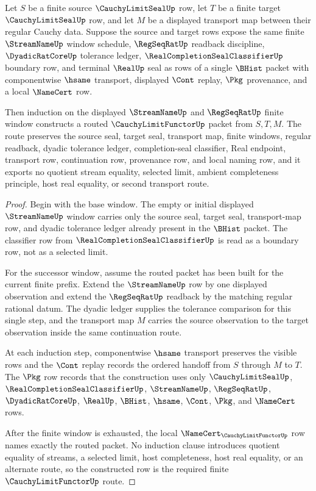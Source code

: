 \begin{theorem}
\label{thm:cauchy-limit-functor-induction-route}
Let $S$ be a finite source $\CauchyLimitSealUp$ row, let $T$ be a finite target $\CauchyLimitSealUp$ row, and let $M$ be a displayed transport map between their regular Cauchy data. Suppose the source and target rows expose the same finite $\StreamNameUp$ window schedule, $\RegSeqRatUp$ readback discipline, $\DyadicRatCoreUp$ tolerance ledger, $\RealCompletionSealClassifierUp$ boundary row, and terminal $\RealUp$ seal as rows of a single $\BHist$ packet with componentwise $\hsame$ transport, displayed $\Cont$ replay, $\Pkg$ provenance, and a local $\NameCert$ row.

Then induction on the displayed $\StreamNameUp$ and $\RegSeqRatUp$ finite window constructs a routed $\CauchyLimitFunctorUp$ packet from $S,T,M$. The route preserves the source seal, target seal, transport map, finite windows, regular readback, dyadic tolerance ledger, completion-seal classifier, Real endpoint, transport row, continuation row, provenance row, and local naming row, and it exports no quotient stream equality, selected limit, ambient completeness principle, host real equality, or second transport route.
\end{theorem}
\begin{proof}
Begin with the base window. The empty or initial displayed $\StreamNameUp$ window carries only the source seal, target seal, transport-map row, and dyadic tolerance ledger already present in the $\BHist$ packet. The classifier row from $\RealCompletionSealClassifierUp$ is read as a boundary row, not as a selected limit.

For the successor window, assume the routed packet has been built for the current finite prefix. Extend the $\StreamNameUp$ row by one displayed observation and extend the $\RegSeqRatUp$ readback by the matching regular rational datum. The dyadic ledger supplies the tolerance comparison for this single step, and the transport map $M$ carries the source observation to the target observation inside the same continuation route.

At each induction step, componentwise $\hsame$ transport preserves the visible rows and the $\Cont$ replay records the ordered handoff from $S$ through $M$ to $T$. The $\Pkg$ row records that the construction uses only $\CauchyLimitSealUp$, $\RealCompletionSealClassifierUp$, $\StreamNameUp$, $\RegSeqRatUp$, $\DyadicRatCoreUp$, $\RealUp$, $\BHist$, $\hsame$, $\Cont$, $\Pkg$, and $\NameCert$ rows.

After the finite window is exhausted, the local $\NameCert_{\CauchyLimitFunctorUp}$ row names exactly the routed packet. No induction clause introduces quotient equality of streams, a selected limit, host completeness, host real equality, or an alternate route, so the constructed row is the required finite $\CauchyLimitFunctorUp$ route.
\end{proof}

